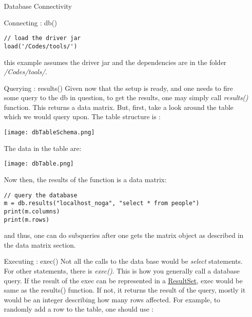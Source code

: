 \begin{section}{Database Connectivity}
\begin{subsection}{Connecting : db()}
\begin{center}\begin{minipage}{\linewidth}
\begin{lstlisting}[style=JexlStyle]
// load the driver jar
load('/Codes/tools/')
\end{lstlisting}
\end{minipage}\end{center}
this example assumes the driver jar and the dependencies are in the folder \emph{/Codes/tools/}.
\end{subsection}

\begin{subsection}{Querying : results()}
Given now that the setup is ready, and one needs to fire some query to the db in question,
to get the results, one may simply call \emph{results()} function.
This returns a data matrix. But, first, take a look around the table which we would query upon.
The table structure is :

\centerline{
  \texttt{[image: dbTableSchema.png]}
}

The data in the table are:

\centerline{
  \texttt{[image: dbTable.png]}
}


Now then, the results of the function is a data matrix:

\begin{center}\begin{minipage}{\linewidth}
\begin{lstlisting}[style=JexlStyle]
// query the database
m = db.results("localhost_noga", "select * from people")
print(m.columns)
print(m.rows) 
\end{lstlisting}
\end{minipage}\end{center}

and thus, one can do subqueries after one gets the matrix object as described
in the data matrix section.
\end{subsection}

\begin{subsection}{Executing : exec() }
Not all the calls to the data base would be \emph{select} statements. For other statements,
there is \emph{exec()}. This is how you generally call a database query.
If the result of the exec can be represented in a 
\href{https://docs.oracle.com/javase/8/docs/api/java/sql/ResultSet.html}{ResultSet}, exec   
would be same as the results() function. If not, it returns the result of the query, 
mostly it would be an integer describing how many rows affected. For example,
to randomly add a row to the table, one should use :


\end{subsection}
\end{section}

